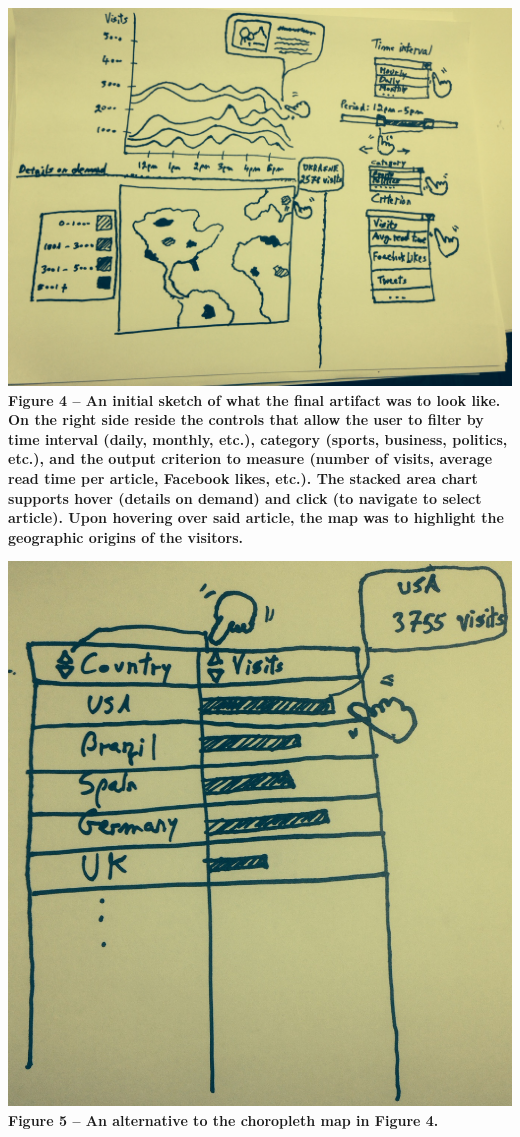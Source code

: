 \documentclass[12pt]{article}
\begin{document}
\noindent\includegraphics[scale=0.2]{img/overall_viz}
\noindent\textbf{Figure 4 -- An initial sketch of what the final artifact was to look like. On the right side reside the controls that allow the user to filter by time interval (daily, monthly, etc.), category (sports, business, politics, etc.), and the output criterion to measure (number of visits, average read time per article, Facebook likes, etc.). The stacked area chart supports hover (details on demand) and click (to navigate to select article). Upon hovering over said article, the map was to highlight the geographic origins of the visitors.}

\noindent\includegraphics[scale=0.2]{img/table} \\
\noindent\textbf{Figure 5 -- An alternative to the choropleth map in Figure 4.} \\
\end{document}
